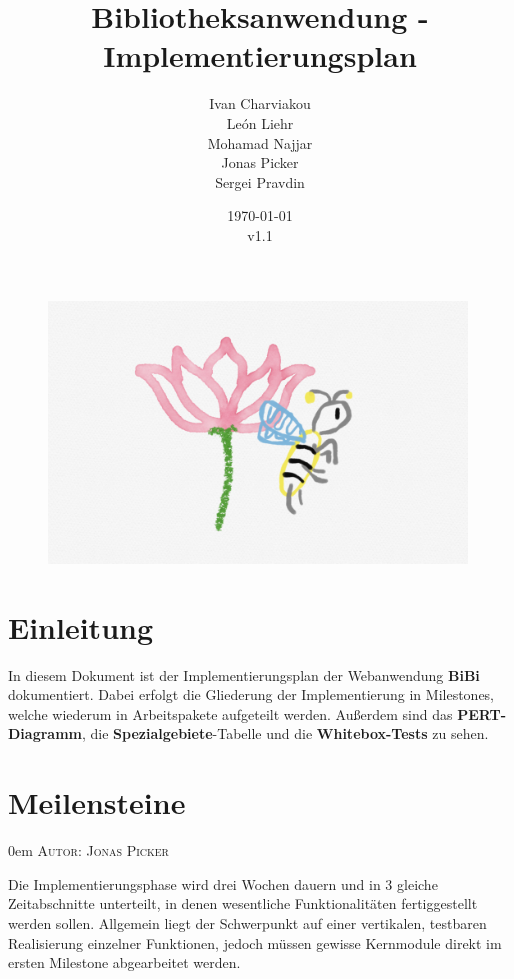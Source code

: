 \documentclass{article}
\title{Bibliotheksanwendung - Implementierungsplan}
\date{\today\\v1.1}
\author{
	Ivan Charviakou\\
	León Liehr\\
	Mohamad Najjar\\
	Jonas Picker\\
	Sergei Pravdin
}
\makeatletter
\newcommand{\sectionauthor}[1]{
	{\parindent 0em \large \scshape Autor: #1 \par \nobreak \vspace*{1em}}
	\@afterheading
}
\makeatother
\begin{document}
\maketitle
\begin{figure}[H]
	\centering
	\includegraphics[width = 30em]{Logo}
\end{figure}
\newpage
\tableofcontents
\newpage


\section{Einleitung}

In diesem Dokument ist der Implementierungsplan der Webanwendung \textbf{BiBi} dokumentiert. Dabei erfolgt die Gliederung der Implementierung in Milestones, welche wiederum in Arbeitspakete aufgeteilt werden. Außerdem sind das \textbf{PERT-Diagramm},   die \textbf{Spezialgebiete}-Tabelle und die \textbf{Whitebox-Tests} zu sehen.


\section{Meilensteine}
\sectionauthor{Jonas Picker}
Die Implementierungsphase wird drei Wochen dauern und in 3 gleiche Zeitabschnitte unterteilt, in denen wesentliche Funktionalitäten fertiggestellt werden sollen. Allgemein liegt der Schwerpunkt auf einer vertikalen, testbaren Realisierung einzelner Funktionen, jedoch müssen gewisse Kernmodule direkt im ersten Milestone abgearbeitet werden. 
\end{document}
